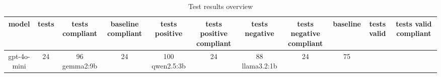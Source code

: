 
  \begin{table}[h!]
  \centering
  \begin{tabular}{|c|c|c|c|c|c|c|c|c|c|c|}
  \hline
  model & tests & tests compliant & baseline compliant & tests positive & tests positive compliant & tests negative & tests negative compliant & baseline & tests valid & tests valid compliant \\
  \hline
  gpt-4o-mini & 24 & 96%
\hline
gemma2:9b & 24 & 100%
\hline
qwen2.5:3b & 24 & 88%
\hline
llama3.2:1b & 24 & 75%
  \end{tabular}
  \caption{Test results overview}
  
  \end{table}
  